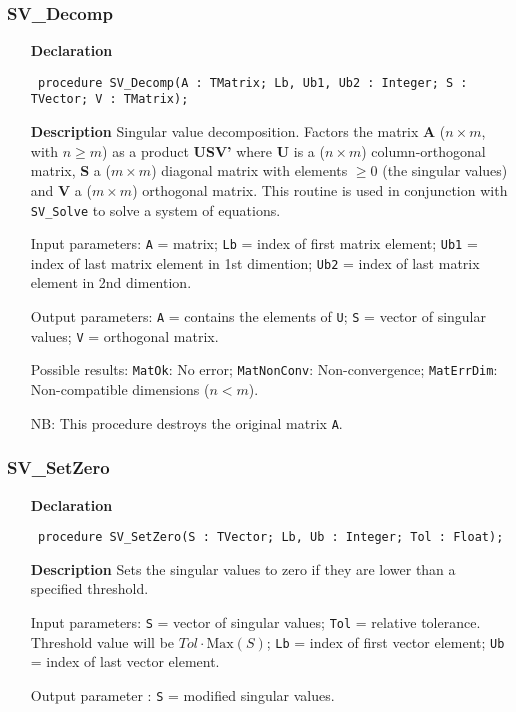 \documentclass[12pt,a4paper,oneside]{report}
\newcommand{\declarationitem}[1]{\textbf{#1}}
\newcommand{\descriptiontitle}[1]{\textbf{#1}}
\newcommand{\code}[1]{\texttt{#1}}
\begin{document}
\subsubsection{SV{\_}Decomp}
\label{usvd-SV_Decomp}
\begin{itemize}\item[\declarationitem{Declaration}\hfill]
	\begin{flushleft}
		\code{
			procedure SV{\_}Decomp(A : TMatrix; Lb, Ub1, Ub2 : Integer; S : TVector; V : TMatrix);}
		
	\end{flushleft}
	
	\par
	\item[\descriptiontitle{Description}]
	Singular value decomposition. Factors the matrix \textbf{A} ($n \times m$, with $n \ge m$) as a product \textbf{USV'} where \textbf{U} is a ($n \times m$) column-orthogonal matrix, \textbf{S} a ($m \times m$) diagonal matrix with elements $ \ge 0$ (the singular values) and \textbf{V} a ($m \times m$) orthogonal matrix. This routine is used in conjunction with \code{SV{\_}Solve} to solve a system of equations.
	
	Input parameters: \code{A} = matrix; \code{Lb} = index of first matrix element; \code{Ub1} = index of last matrix element in 1st dimention; \code{Ub2} = index of last matrix element in 2nd dimention.
	
	Output parameters: \code{A} = contains the elements of \code{U}; \code{S} = vector of singular values; \code{V} = orthogonal matrix.
	
	Possible results: \code{MatOk}: No error; \code{MatNonConv}: Non-convergence; \code{MatErrDim}: Non-compatible dimensions ($n < m$).
	
	NB: This procedure destroys the original matrix \code{A}.
	
\end{itemize}
\subsubsection{SV{\_}SetZero}
\label{usvd-SV_SetZero}
\begin{itemize}\item[\declarationitem{Declaration}\hfill]
	\begin{flushleft}
		\code{
			procedure SV{\_}SetZero(S : TVector; Lb, Ub : Integer; Tol : Float);}
		
	\end{flushleft}
	
	\par
	\item[\descriptiontitle{Description}]
	Sets the singular values to zero if they are lower than a specified threshold.
	
	Input parameters: \code{S} = vector of singular values; \code{Tol} = relative tolerance. Threshold value will be $Tol \cdot \textrm{Max}(S)$; \code{Lb} = index of first vector element; \code{Ub} = index of last vector element.
	
	Output parameter : \code{S} = modified singular values.
	
\end{itemize}
\end{document}
